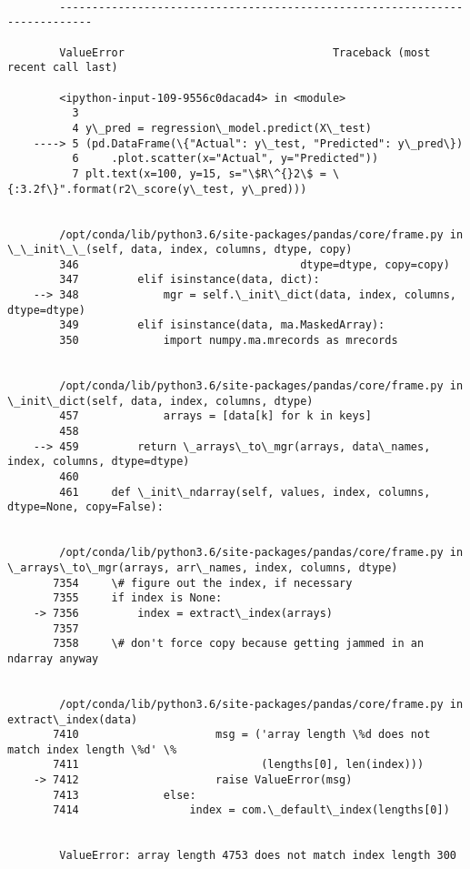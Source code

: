 \documentclass[11pt]{article}
\begin{document}
    \begin{Verbatim}[commandchars=\\\{\}]

        ---------------------------------------------------------------------------

        ValueError                                Traceback (most recent call last)

        <ipython-input-109-9556c0dacad4> in <module>
          3 
          4 y\_pred = regression\_model.predict(X\_test)
    ----> 5 (pd.DataFrame(\{"Actual": y\_test, "Predicted": y\_pred\})
          6     .plot.scatter(x="Actual", y="Predicted"))
          7 plt.text(x=100, y=15, s="\$R\^{}2\$ = \{:3.2f\}".format(r2\_score(y\_test, y\_pred)))


        /opt/conda/lib/python3.6/site-packages/pandas/core/frame.py in \_\_init\_\_(self, data, index, columns, dtype, copy)
        346                                  dtype=dtype, copy=copy)
        347         elif isinstance(data, dict):
    --> 348             mgr = self.\_init\_dict(data, index, columns, dtype=dtype)
        349         elif isinstance(data, ma.MaskedArray):
        350             import numpy.ma.mrecords as mrecords


        /opt/conda/lib/python3.6/site-packages/pandas/core/frame.py in \_init\_dict(self, data, index, columns, dtype)
        457             arrays = [data[k] for k in keys]
        458 
    --> 459         return \_arrays\_to\_mgr(arrays, data\_names, index, columns, dtype=dtype)
        460 
        461     def \_init\_ndarray(self, values, index, columns, dtype=None, copy=False):


        /opt/conda/lib/python3.6/site-packages/pandas/core/frame.py in \_arrays\_to\_mgr(arrays, arr\_names, index, columns, dtype)
       7354     \# figure out the index, if necessary
       7355     if index is None:
    -> 7356         index = extract\_index(arrays)
       7357 
       7358     \# don't force copy because getting jammed in an ndarray anyway


        /opt/conda/lib/python3.6/site-packages/pandas/core/frame.py in extract\_index(data)
       7410                     msg = ('array length \%d does not match index length \%d' \%
       7411                            (lengths[0], len(index)))
    -> 7412                     raise ValueError(msg)
       7413             else:
       7414                 index = com.\_default\_index(lengths[0])


        ValueError: array length 4753 does not match index length 300

    \end{Verbatim}
\end{document}
